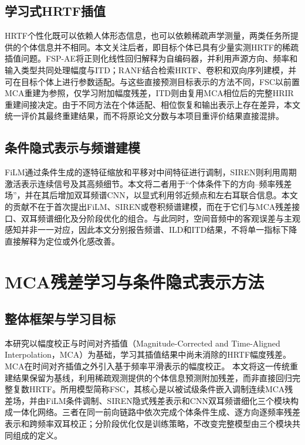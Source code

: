 \documentclass[UTF8,a4paper]{article}
\begin{document}
\subsection{学习式HRTF插值}
HRTF个性化既可以依赖人体形态信息，也可以依赖稀疏声学测量，两类任务所提供的个体信息并不相同\cite{R15,R16}。本文关注后者，即目标个体已具有少量实测HRTF的稀疏插值问题。FSP-AE将正则化线性回归解释为自编码器，并利用声源方向、频率和输入类型共同处理幅度与ITD\cite{R4}；RANF结合检索HRTF、卷积和双向序列建模，并可在目标个体上进行参数适配\cite{R5}。与这些直接预测目标表示的方法不同，FSC以前置MCA重建为参照，仅学习附加幅度残差，ITD则由复用MCA相位后的完整HRIR重建间接决定。由于不同方法在个体适配、相位恢复和输出表示上存在差异，本文统一评价其最终重建结果，而不将原论文分数与本项目重评价结果直接混排。

\subsection{条件隐式表示与频谱建模}
FiLM通过条件生成的逐特征缩放和平移对中间特征进行调制\cite{R7}，SIREN则利用周期激活表示连续信号及其高频细节\cite{R11}。本文将二者用于“个体条件下的方向--频率残差场”，并在其后增加双耳频谱CNN，以显式利用邻近频点和左右耳联合信息。本文的贡献不在于首次提出FiLM、SIREN或卷积频谱建模，而在于它们与MCA残差接口、双耳频谱细化及分阶段优化的组合。与此同时，空间音频中的客观误差与主观感知并非一一对应\cite{R18}，因此本文分别报告频谱、ILD和ITD结果，不将单一指标下降直接解释为定位或外化感改善。

\section{MCA残差学习与条件隐式表示方法}
\label{sec:method}

\subsection{整体框架与学习目标}
本研究以幅度校正与时间对齐插值（Magnitude-Corrected and Time-Aligned Interpolation，MCA）为基础，学习其插值结果中尚未消除的HRTF幅度残差。MCA在时间对齐插值之外引入基于频率平滑表示的幅度校正\cite{R1}。
本文将这一传统重建结果保留为基线，利用稀疏观测提供的个体信息预测附加残差，而非直接回归完整复数HRTF。所用模型简称FSC，其核心是以被试级条件嵌入调制连续MCA残差场，并由FiLM条件调制、SIREN隐式残差表示和CNN双耳频谱细化三个模块构成一体化网络。三者在同一前向链路中依次完成个体条件生成、逐方向逐频率残差表示和跨频率双耳校正；分阶段优化仅是训练策略，不改变完整模型由三个模块共同组成的定义。
\end{document}
